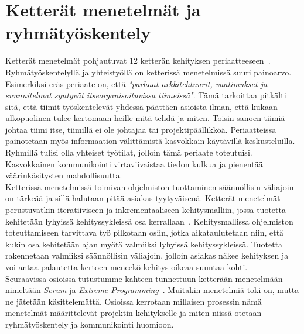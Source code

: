 \documentclass[finnish]{../tktltiki2}
\theoremstyle{definition}
\theoremstyle{remark}
\begin{document}
\section{Ketterät menetelmät ja ryhmätyöskentely}


Ketterät menetelmät pohjautuvat 12 ketterän 
kehityksen periaatteeseen~\cite{AgileManifesto}. Ryhmätyöskentelyllä 
ja yhteistyöllä on ketterissä
menetelmissä suuri painoarvo. Esimerkiksi eräs periaate on, että 
\emph{"parhaat arkkitehtuurit, vaatimukset ja suunnitelmat syntyvät 
itseorganisoituvissa
tiimeissä"}. Tämä tarkoittaa pitkälti sitä, että tiimit työskentelevät 
yhdessä päättäen asioista ilman, että kukaan ulkopuolinen tulee
kertomaan heille mitä tehdä ja miten. Toisin sanoen tiimiä johtaa tiimi itse, 
tiimillä ei ole johtajaa tai projektipäällikköä. Periaatteissa 
painotetaan
myös informaation välittämistä kasvokkain käytävillä keskusteluilla. 
Ryhmillä tulisi olla yhteiset työtilat, jolloin tämä periaate 
toteutuisi.
Kasvokkainen kommunikointi virtaviivaistaa tiedon kulkua ja pienentää 
väärinkäsitysten mahdollisuutta.\\

Ketterissä menetelmissä toimivan ohjelmiston tuottaminen säännöllisin 
väliajoin on tärkeää ja sillä halutaan pitää asiakas tyytyväisenä.
Ketterät menetelmät perustuvatkin iteratiiviseen ja inkrementaaliseen kehitysmalliin, jossa tuotetta kehitetään lyhyissä kehityssykleissä osa kerrallaan~\cite{Cockburn:2008}. Kehitysmallissa ohjelmiston toteuttamiseen tarvittava työ pilkotaan osiin, jotka aikataulutetaan niin, että kukin osa kehitetään ajan myötä valmiiksi lyhyissä kehityssykleissä. Tuotetta rakennetaan valmiiksi säännöllisin väliajoin, jolloin asiakas näkee kehityksen ja voi antaa palautetta kertoen meneekö kehitys oikeaa suuntaa kohti.\\

Seuraavissa osioissa tutustumme kahteen tunnettuun
ketterään menetelmään nimeltään \emph{Scrum} ja \emph{Extreme Programming}~\cite{ScrumFinnishGuide,Scrumprimer,ScrumHandBook,Beck:2004:EPE:1076267}. Muitakin menetelmiä toki on, mutta ne jätetään käsittelemättä. Osioissa kerrotaan millaisen prosessin nämä menetelmät
määrittelevät projektin kehitykselle ja miten niissä otetaan ryhmätyöskentely ja kommunikointi huomioon.
\end{document}
